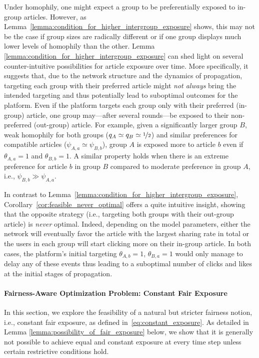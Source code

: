 \documentclass[letterpaper]{article} %
\begin{document}
Under homophily, one might expect a group to be preferentially exposed to in-group articles.
%
However, as Lemma~\ref{lemma:condition_for_higher_intergroup_exposure} shows, this may not be the case if group sizes are radically different or if one group displays much lower levels of homophily than the other.
%
Lemma \ref{lemma:condition_for_higher_intergroup_exposure} can shed light on several counter-intuitive possibilities for article exposure over time. 
%
More specifically, it suggests that, due to the network structure and the dynamics of propagation, targeting each group with their preferred article might \textit{not always} bring the intended targeting  and thus potentially lead to suboptimal outcomes for the platform.
%
Even if the platform targets each group only with their preferred (in-group) article, one group may---after several rounds---be exposed to their non-preferred (out-group) article. 
%
For example, given a significantly larger group $B$, weak homophily for both groups ($q_A \simeq q_B \simeq \nicefrac{1}{2}$) and similar preferences for compatible articles ($\psi_{A,a} \simeq \psi_{B,b}$), group $A$ is exposed more to article $b$ even if $\theta_{A,a}=1$ and $\theta_{B,b}=1$.
%
A similar property holds when there is an extreme preference for article $b$ in group $B$ compared to moderate preference in group $A$, i.e., $\psi_{B,b} \gg \psi_{A,a}$.

In contrast to Lemma~\ref{lemma:condition_for_higher_intergroup_exposure}, Corollary~\ref{cor:feasible_never_optimal} offers a quite intuitive insight, showing that the opposite strategy (i.e., targeting both groups with their out-group article) is \textit{never} optimal.
%
Indeed, depending on the model parameters, either the network will eventually favor the article with the largest sharing rate in total or the users in each group will start clicking more on their in-group article.
%
In both cases, the platform's initial targeting $\theta_{A,b}=1$, $\theta_{B,a}=1$ would only manage to delay any of these events thus leading to a suboptimal number of clicks and likes at the initial stages of propagation.

\paragraph{Fairness-Aware Optimization Problem: Constant Fair Exposure}
In this section, we explore the feasibility of a natural but stricter fairness notion, i.e., constant fair exposure, as defined in~\eqref{eq:constant_exposure}.
%
As detailed in Lemma \ref{lemma:possibility_of_fair_exposure} below, we show that it is generally not possible to achieve  equal and constant exposure at every time step unless certain restrictive conditions hold.
\end{document}

